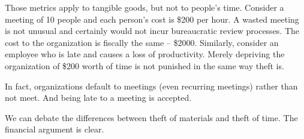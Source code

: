 Those metrics apply to tangible goods, but not to people's time. Consider a meeting of 10 people and each person's cost is \$200 per hour. A wasted meeting is not unusual and certainly would not incur bureaucratic review processes. The cost to the organization is fiscally the same -- \$2000. Similarly, consider an employee who is late and causes a loss of productivity. Merely depriving the organization of \$200 worth of time is not punished in the same way theft is.

In fact, organizations default to meetings (even recurring meetings) rather than not meet. And being late to a meeting is accepted. 

We can debate the differences between theft of materials and theft of time. The financial argument is clear. 
